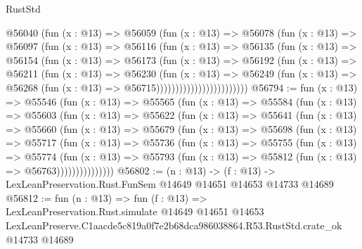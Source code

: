 \begin{lexlean}{RustStd}
\begin{coremodule}
                        @56040
                          (fun (x : @13) =>
                          @56059
                            (fun (x : @13) =>
                            @56078
                              (fun (x : @13) =>
                              @56097
                                (fun (x : @13) =>
                                @56116
                                  (fun (x : @13) =>
                                  @56135
                                    (fun (x : @13) =>
                                    @56154
                                      (fun (x : @13) =>
                                      @56173
                                        (fun (x : @13) =>
                                        @56192
                                          (fun (x : @13) =>
                                          @56211
                                            (fun (x : @13) =>
                                            @56230
                                              (fun (x : @13) =>
                                              @56249
                                                (fun (x : @13) =>
                                                @56268
                                                  (fun (x : @13) => @56715))))))))))))))))))))))))
@56794 := fun (x : @13) =>
  @55546
    (fun (x : @13) =>
    @55565
      (fun (x : @13) =>
      @55584
        (fun (x : @13) =>
        @55603
          (fun (x : @13) =>
          @55622
            (fun (x : @13) =>
            @55641
              (fun (x : @13) =>
              @55660
                (fun (x : @13) =>
                @55679
                  (fun (x : @13) =>
                  @55698
                    (fun (x : @13) =>
                    @55717
                      (fun (x : @13) =>
                      @55736
                        (fun (x : @13) =>
                        @55755
                          (fun (x : @13) =>
                          @55774
                            (fun (x : @13) =>
                            @55793 (fun (x : @13) => @55812 (fun (x : @13) => @56763)))))))))))))))
@56802 := (n : @13) ->
  (f : @13) -> LexLeanPreservation.Rust.FunSem @14649 @14651 @14653 @14733 @14689
@56812 := fun (n : @13) =>
  fun (f : @13) =>
  LexLeanPreservation.Rust.simulate
    @14649
    @14651
    @14653
    LexLeanPreserve.C1aacde5c819a0f7e2b68dca986038864.R53.RustStd.crate_ok
    @14733
    @14689
\end{coremodule}
\end{lexlean}
